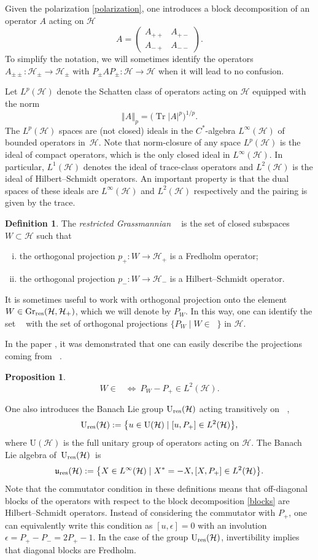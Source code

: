 \documentclass[pdftex]{sigma}
\newtheorem{prop}[thm]{Proposition}
\theoremstyle{definition}
\newtheorem{defn}[thm]{Definition}
\numberwithin{equation}{section}
\newcommand{\norm}[1]{\left\Vert#1\right\Vert}
\renewcommand{\H}{\mathcal{H}}
\DeclareMathOperator{\Gr}{Gr_{res}(\H,\H_+)}
\newcommand{\U}{\mathrm{U}(\H)}
\newcommand{\Ur}{\mathrm{U}_{\textnormal{res}}(\H)}
\newcommand{\ur}{\mathfrak u_{\textnormal{res}}(\H)}
\DeclareMathOperator{\Tr}{Tr}
\newcommand{\Li}{L^\infty(\H)}
\newcommand{\Lj}{L^1(\H)}
\newcommand{\Ld}{L^2(\H)}
\newcommand{\Lp}{L^p(\H)}
\newcommand{\abs}[1]{\left\vert#1\right\vert}
\renewcommand{\to}{\rightarrow}
\newcommand{\be}{\begin{equation}}
\newcommand{\ee}{\end{equation}}
\newcommand{\ben}{\begin{enumerate}}
\newcommand{\een}{\end{enumerate}}
\begin{document}
Given the polarization \eqref{polarization}, one introduces a block decomposition of an operator $A$ acting on $\H$
\be \label{blocks}
A=\left(
\begin{matrix}
 A_{++} & A_{+-}\\
 A_{-+} & A_{--}
\end{matrix}
\right).\ee
To simplify the notation, we will sometimes identify the operators $A_{\pm\pm}\colon\H_\pm\to\H_\pm$ with $P_\pm A P_\pm\colon\H\to\H$ when it will lead to no confusion.

Let $\Lp$ denote the Schatten class of operators acting on $\H$ equipped with the norm
\[
 \norm{A}_p = \bigl(\Tr \abs A^p\bigr)^{1/p}.
 \]
The $\Lp$ spaces are (not closed) ideals in the $C^*$-algebra $\Li$ of bounded operators in~$\H$. Note that norm-closure of any space $\Lp$ is the ideal of compact operators, which is the only closed ideal in $\Li$. In particular, $\Lj$ denotes the ideal of trace-class operators and $\Ld$ is the ideal of Hilbert--Schmidt operators. An important property is that the dual spaces of these ideals are $\Li$ and $\Ld$ respectively and the pairing is given by the trace.

\begin{defn}
The \emph{restricted Grassmannian} $\Gr$ is the set of closed subspaces ${W\subset\H}$ such that
\ben[(i)]\itemsep=0pt
\item the orthogonal projection $p_+\colon W\to \H_+$ is a Fredholm operator;
\item the orthogonal projection $p_-\colon W\to \H_-$ is a Hilbert--Schmidt operator.
\een
\end{defn}

It is sometimes useful to work with orthogonal projection onto the element $W\in \operatorname{Gr}_{\rm res}(\H, \H_+)$, which we will denote by $P_W$. In this way, one can identify the set $\Gr$ with the set of orthogonal projections $\{ P_W \mid W\in\Gr\}$ in $\H$.

In the paper \cite{spera-valli}, it was demonstrated that one can easily describe the projections coming from $\Gr$.
\begin{prop}\label{prop:gr-proj}
\[ W\in\Gr \ \Longleftrightarrow \ P_W-P_+ \in \Ld. \]
\end{prop}
One also introduces the Banach Lie group $\Ur$ acting transitively on $\Gr$,
\[
\Ur:=\bigl\{ u\in \U \mid [u,P_+]\in \Ld\bigr\},
\]
where $\U$ is the full unitary group of operators acting on $\H$. The Banach Lie algebra of~$\Ur$~is
\[
\ur:=\bigl\{ X\in \Li \mid X^* = -X, [X,P_+]\in \Ld\bigr\}.\]
Note that the commutator condition in these definitions means that off-diagonal blocks of the operators with respect to the block decomposition \eqref{blocks} are Hilbert--Schmidt operators. Instead of considering the commutator with $P_+$, one can equivalently write this condition as $[u, \epsilon] = 0$ with an involution $\epsilon = P_+-P_- = 2P_+-1$. In the case of the group $\Ur$, invertibility implies that diagonal blocks are Fredholm.
\end{document}
